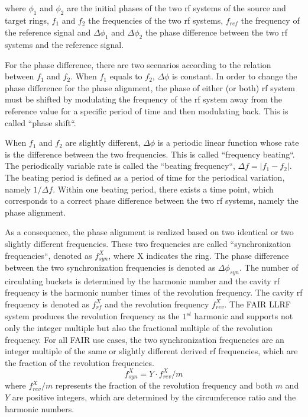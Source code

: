 where $\phi_1$ and $\phi_2$ are the initial phases of the two rf systems of the source and target rings, $f_1$ and $f_2$ the frequencies of the two rf systems, $f_\mathit{ref}$ the frequency of the reference signal and $\Delta \phi_1$ and $\Delta \phi_2$ the phase difference between the two rf systems and the reference signal. 

For the phase difference, there are two scenarios according to the relation between $f_1$ and $f_2$. When $f_1$ equals to $f_2$, $\Delta \phi$ is constant. In order to change the phase difference for the phase alignment, the phase of either (or both) rf system must be shifted by modulating the frequency of the rf system away from the reference value for a specific period of time and then modulating back. This is called ``phase shift``.

When $f_1$ and $f_2$ are slightly different, $\Delta \phi$ is a periodic linear function whose rate is the difference between the two frequencies. This is called ``frequency beating``. The periodically variable rate is called the ``beating frequency``, $\Delta f=|f_1-f_2|$. The beating period is defined as a period of time for the periodical variation, namely $1/\Delta f$. Within one beating period, there exists a time point, which corresponds to a correct phase difference between the two rf systems, namely the phase alignment. 

As a consequence, the phase alignment is realized based on two identical or two slightly different frequencies. These two frequencies are called ``synchronization frequencies``, denoted as $f_\mathit{syn}^{X}$, where X indicates the ring. The phase difference between the two synchronization frequencies is denoted as $\Delta \phi_\mathit{syn}$. The number of circulating buckets is determined by the harmonic number and the cavity rf frequency is the harmonic number times of the revolution frequency. The cavity rf frequency is denoted as $f_\mathit{rf}^{X}$ and the revolution frequency $f_\mathit{rev}^{X}$. The FAIR LLRF system produces the revolution frequency as the $1^{st}$ harmonic and supports not only the integer multiple but also the fractional multiple of the revolution frequency. For all FAIR use cases, the two synchronization frequencies are an integer multiple of the same or slightly different derived rf frequencies, which are the fraction of the revolution frequencies.
\begin{equation}
f_\mathit{syn}^{X}= Y\cdot f_\mathit{rev}^{X}/m
\label{syn_form}
\end{equation}
where $f_\mathit{rev}^{X}/m$ represents the fraction of the revolution frequency and both $m$ and $Y$ are positive integers, which are determined by the circumference ratio and the harmonic numbers. 

